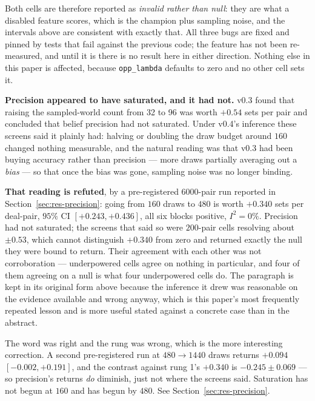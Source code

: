 \documentclass[11pt,a4paper]{article}
\begin{document}
Both cells are therefore reported as \emph{invalid rather than null}: they are
what a disabled feature scores, which is the champion plus sampling noise, and
the intervals above are consistent with exactly that. All three bugs are fixed
and pinned by tests that fail against the previous code; the feature has not
been re-measured, and until it is there is no result here in either direction.
Nothing else in this paper is affected, because \texttt{opp\_lambda} defaults to
zero and no other cell sets it.

\textbf{Precision appeared to have saturated, and it had not.} v0.3 found that
raising the sampled-world count from 32 to 96 was worth $+0.54$ sets per pair
and concluded that belief precision had not saturated. Under v0.4's inference
these screens said it plainly had: halving or doubling the draw budget around
$160$ changed nothing measurable, and the natural reading was that v0.3 had been
buying accuracy rather than precision --- more draws partially averaging out a
\emph{bias} --- so that once the bias was gone, sampling noise was no longer
binding.

\textbf{That reading is refuted}, by a pre-registered $6000$-pair run reported
in Section~\ref{sec:res-precision}: going from $160$ draws to $480$ is worth
$\mathbf{+0.340}$ sets per deal-pair, $95\%$ CI $[+0.243, +0.436]$, all six
blocks positive, $I^2 = 0\%$. Precision had not saturated; the screens that said
so were $200$-pair cells resolving about $\pm 0.53$, which cannot distinguish
$+0.340$ from zero and returned exactly the null they were bound to return.
Their agreement with each other was not corroboration --- underpowered cells
agree on nothing in particular, and four of them agreeing on a null is what four
underpowered cells do. The paragraph is kept in its original form above because
the inference it drew was reasonable on the evidence available and wrong anyway,
which is this paper's most frequently repeated lesson and is more useful stated
against a concrete case than in the abstract.

The word was right and the rung was wrong, which is the more interesting
correction. A second pre-registered run at $480 \to 1440$ draws returns
$+0.094$ $[-0.002, +0.191]$, and the contrast against rung 1's $+0.340$ is
$-0.245 \pm 0.069$ --- so precision's returns \emph{do} diminish, just not
where the screens said. Saturation has not begun at $160$ and has begun by
$480$. See Section~\ref{sec:res-precision}.
\end{document}
